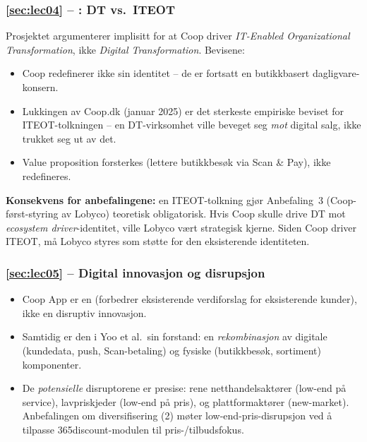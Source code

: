 \subsubsection*{\autoref{sec:lec04} -- : DT vs.\ ITEOT}
 Prosjektet
argumenterer implisitt for at Coop driver \emph{IT-Enabled Organizational
Transformation}, ikke \emph{Digital Transformation}. Bevisene:
\begin{itemize}
  \item Coop redefinerer ikke sin identitet -- de er fortsatt en
    butikkbasert dagligvare-konsern.
  \item Lukkingen av Coop.dk (januar 2025) er det sterkeste empiriske
    beviset for ITEOT-tolkningen -- en DT-virksomhet ville beveget seg
    \emph{mot} digital salg, ikke trukket seg ut av det.
  \item Value proposition forsterkes (lettere butikkbesøk via Scan \& Pay),
    ikke redefineres.
\end{itemize}
\textbf{Konsekvens for anbefalingene:} en ITEOT-tolkning gjør Anbefaling~3
(Coop-først-styring av Lobyco) teoretisk obligatorisk. Hvis Coop skulle
drive DT mot \emph{ecosystem driver}-identitet, ville Lobyco vært
strategisk kjerne. Siden Coop driver ITEOT, må Lobyco styres som støtte for
den eksisterende identiteten.

\subsubsection*{\autoref{sec:lec05} -- Digital innovasjon og disrupsjon}
\begin{itemize}
  \item Coop App er en  (forbedrer eksisterende
    verdiforslag for eksisterende kunder), ikke en disruptiv innovasjon.
  \item Samtidig er den  i Yoo et al.\ sin
    forstand: en \emph{rekombinasjon} av digitale (kundedata, push,
    Scan-betaling) og fysiske (butikkbesøk, sortiment) komponenter.
  \item De \emph{potensielle} disruptorene er presise: rene
    netthandelsaktører (low-end på service), lavpriskjeder (low-end på
    pris), og plattformaktører (new-market). Anbefalingen om
    diversifisering (2) møter low-end-pris-disrupsjon ved å tilpasse
    365discount-modulen til pris-/tilbudsfokus.
\end{itemize}

